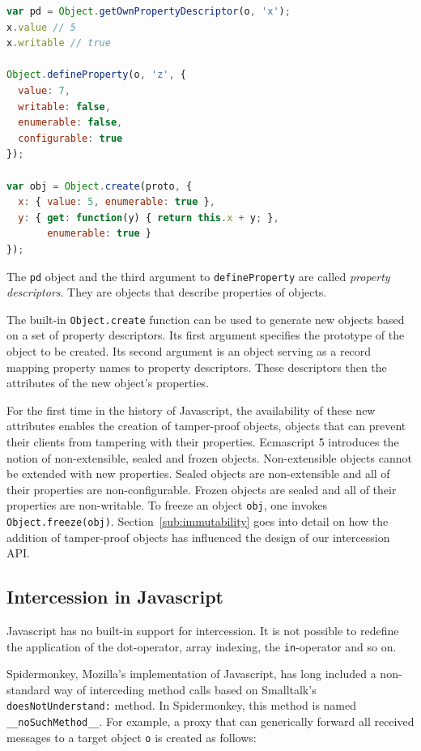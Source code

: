 \documentclass{acm_proc_article-sp}
\newcommand{\noSuchMethod}{\texttt{\_\_noSuchMethod\_\_}}
\begin{document}
\begin{lstlisting}[language=javascript]
var pd = Object.getOwnPropertyDescriptor(o, 'x');
x.value // 5
x.writable // true

Object.defineProperty(o, 'z', {
  value: 7,
  writable: false,
  enumerable: false,
  configurable: true
});

var obj = Object.create(proto, {
  x: { value: 5, enumerable: true },
  y: { get: function(y) { return this.x + y; },
       enumerable: true }
});
\end{lstlisting}

The \texttt{pd} object and the third argument to \texttt{defineProperty} are called \emph{property descriptors}. They are objects that describe properties of objects.

The built-in \texttt{Object.create} function can be used to generate new objects based on a set of property descriptors. Its first argument specifies the prototype of the object to be created. Its second argument is an object serving as a record mapping property names to property descriptors. These descriptors then the attributes of the new object's properties.

For the first time in the history of Javascript, the availability of these new attributes enables the creation of tamper-proof objects, objects that can prevent their clients from tampering with their properties. Ecmascript 5 introduces the notion of non-extensible, sealed and frozen objects. Non-extensible objects cannot be extended with new properties. Sealed objects are non-extensible and all of their properties are non-configurable. Frozen objects are sealed and all of their properties are non-writable. To freeze an object \texttt{obj}, one invokes \texttt{Object.freeze(obj)}. Section~\ref{sub:immutability} goes into detail on how the addition of tamper-proof objects has influenced the design of our intercession API.

\subsection{Intercession in Javascript}
\label{sub:intercession_in_javascript}

Javascript has no built-in support for intercession. It is not possible to redefine the application of the dot-operator, array indexing, the \texttt{in}-operator and so on.

Spidermonkey, Mozilla's implementation of Javascript, has long included a non-standard way of interceding method calls based on Smalltalk's \texttt{doesNotUnderstand:} method. In Spidermonkey, this method is named \noSuchMethod{}. For example, a proxy that can generically forward all received messages to a target object \texttt{o} is created as follows:
\end{document}
